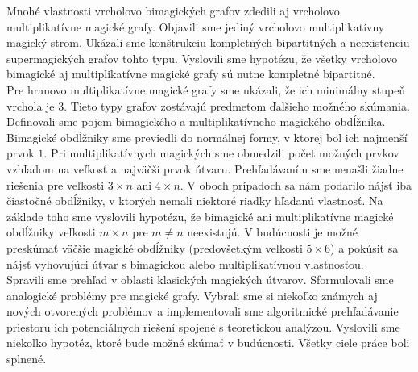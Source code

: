 Mnohé vlastnosti vrcholovo bimagických grafov zdedili aj vrcholovo multiplikatívne magické grafy. Objavili sme jediný vrcholovo multiplikatívny magický strom. Ukázali sme konštrukciu kompletných bipartitných a neexistenciu supermagických grafov tohto typu. Vyslovili sme hypotézu, že všetky vrcholovo bimagické aj multiplikatívne magické grafy sú nutne kompletné bipartitné. \\

Pre hranovo multiplikatívne magické grafy sme ukázali, že ich minimálny stupeň vrchola je $3$. Tieto typy grafov zostávajú predmetom ďalšieho možného skúmania. \\

Definovali sme pojem bimagického a multiplikatívneho magického obdĺžnika. Bimagické obdĺžniky sme previedli do normálnej formy, v ktorej bol ich najmenší prvok $1$. Pri multiplikatívnych magických sme obmedzili počet možných prvkov vzhľadom na veľkosť a najväčší prvok útvaru. Prehľadávaním sme nenašli žiadne riešenia pre veľkosti $3 \times n$ ani $4 \times n$. V oboch prípadoch sa nám podarilo nájsť iba čiastočné obdĺžniky, v ktorých nemali niektoré riadky hľadanú vlastnosť. Na základe toho sme vyslovili hypotézu, že bimagické ani multiplikatívne magické obdĺžniky veľkosti $m \times n$ pre $m \neq n$ neexistujú. V budúcnosti je možné preskúmať väčšie magické obdĺžniky (predovšetkým veľkosti $5 \times 6$) a pokúsiť sa nájsť vyhovujúci útvar s bimagickou alebo multiplikatívnou vlastnosťou. \\

Spravili sme prehľad v oblasti klasických magických útvarov. Sformulovali sme analogické problémy pre magické grafy. Vybrali sme si niekoľko známych aj nových otvorených problémov a implementovali sme algoritmické prehľadávanie priestoru ich potenciálnych riešení spojené s teoretickou analýzou. Vyslovili sme niekoľko hypotéz, ktoré bude možné skúmať v budúcnosti. Všetky ciele práce boli splnené.